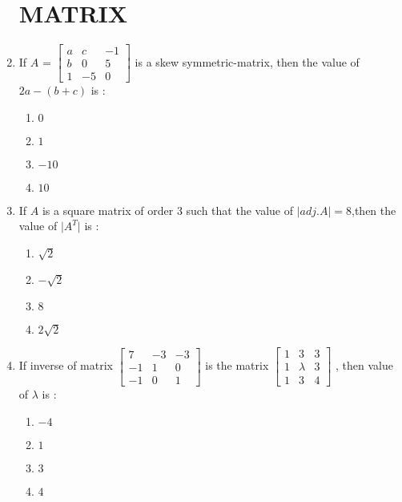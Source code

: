\documentclass{article}
\providecommand{\myvec}[1]{\ensuremath{\begin{bmatrix}#1\end{bmatrix}}}
\providecommand{\brak}[1]{\ensuremath{\left(#1\right)}}
\begin{document}
		\begin{enumerate}
			\section{MATRIX}
		\item If $A$ = $\myvec{a & c & -1 \\b & 0 & 5\\1 & -5 & 0}$ is a skew symmetric-matrix, then the value of $2a - \brak{b+c}$ is :                                                   \begin{enumerate}
        \item ${0}$
        \item ${1}$
        \item ${-10}$
        \item ${10}$
        \end{enumerate}

\item If $A$ is a square matrix of order $3$ such that the value of $\lvert{adj.A}\lvert = 8$,then the value of $\lvert{A^T}\lvert$ is :          
	\begin{enumerate}
                \item $\sqrt{2}$
                        \item $-\sqrt{2}$
                        \item $8$
                        \item $2 \sqrt{2}$
        \end{enumerate}


        \item If inverse of matrix $\myvec{7 & -3 & -3 \\-1 & 1 & 0\\-1 & 0 & 1}$ is the matrix $\myvec{1 & 3 & 3\\1 & \lambda & 3\\1 & 3 & 4}$ ,  then value of $\lambda$ is :
		\begin{enumerate}
                \item $-4$
                        \item $1$
                        \item$3$                                                                           \item $4$                                                          \end{enumerate}



\end{enumerate}
\end{document}
